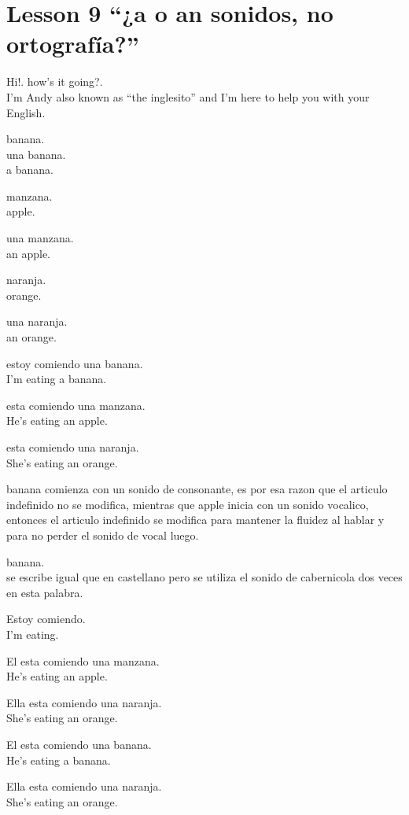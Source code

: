 \section{Lesson 9 ``¿a o an sonidos, no ortografía?''}

Hi!. how's it going?.\\
I'm Andy also known as ``the inglesito'' and I'm here to help you with
your English.

banana.\\

una banana.\\
a banana.

manzana.\\
apple.

una manzana.\\
an apple.

naranja.\\
orange.

una naranja.\\
an orange.

estoy comiendo una banana.\\
I'm eating a banana.

esta comiendo una manzana.\\
He's eating an apple.

esta comiendo una naranja.\\
She's eating an orange.

banana comienza con un sonido de consonante, es por esa razon que
el articulo indefinido no se modifica, mientras que apple inicia con un
sonido vocalico, entonces el articulo indefinido se modifica para mantener
la fluidez al hablar y para no perder el sonido de vocal luego.

banana.\\
se escribe igual que en castellano pero se utiliza el sonido de cabernicola
dos veces en esta palabra.

Estoy comiendo.\\
I'm eating.

El esta comiendo una manzana.\\
He's eating an apple.

Ella esta comiendo una naranja.\\
She's eating an orange.

El esta comiendo una banana.\\
He's eating a banana.

Ella esta comiendo una naranja.\\
She's eating an orange.

